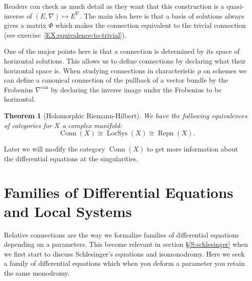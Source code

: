 \documentclass[12pt]{book}
\numberwithin{equation}{section}
\newtheorem{theorem}{Theorem}[subsection]
\theoremstyle{definition}
\theoremstyle{remark}
\newcommand{\LocSys}{\operatorname{LocSys}}
\newcommand{\Conn}{\operatorname{Conn}}
\newcommand{\Repn}{\operatorname{Repn}}
\newcommand{\can}{\operatorname{can}}
\begin{document}
Readers can check as much detail as they want that this construction is a quasi-inverse of $(E,\nabla)\mapsto E^{\nabla}$. 
The main idea here is that a basis of solutions always gives a matrix $\Phi$ which makes the connection equivalent to the trivial connection (see exercise~\ref{EX:equivalence-to-trivial}).

One of the major points here is that a connection is determined by its space of horizontal solutions. 
This allows us to define connections by declaring what their horizontal space is. 
When studying connections in characteristic $p$ on schemes we can define a canonical connection of the pullback of a vector bundle by the Frobenius $\nabla^{\can}$ by declaring the inverse image under the Frobenius to be horizontal.

\begin{theorem}[Holomorphic Riemann-Hilbert]
	We have the following equivalences of categories for $X$ a complex manifold:
	$$ \Conn(X) \cong \LocSys(X) \cong \Repn(X).$$
\end{theorem}

Later we will modify the category $\Conn(X)$ to get more information about the differential equations at the singularities. 

\section{Families of Differential Equations and Local Systems}
Relative connections are the way we formalize families of differential equations depending on a parameters. 
This become relevant in section \S\ref{S:schlesinger} when we first start to discuss Schlesinger's equations and isomonodromy.
Here we seek a family of differential equations which when you deform a parameter you retain the same monodromy. 
\end{document}
